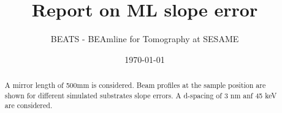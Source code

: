\documentclass{sesamebeatsnote}
\title{Report on ML slope error}
\author{BEATS - BEAmline for Tomography at SESAME}
\date{\today}
\begin{document}
\maketitle

\begin{abstract}
A mirror length of 500mm is considered. Beam profiles at the sample position are shown for different simulated substrates slope errors. A d-spacing of 3 nm anf 45 keV are considered. 
\end{abstract}

\vfill
\makereviewtable
\clearpage

\begingroup
\color{black}
\tableofcontents
\endgroup
\pagebreak

% 






% 
% 
\end{document}
